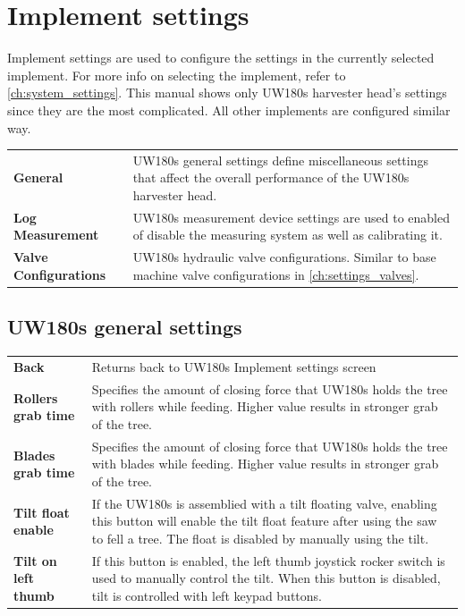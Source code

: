 \documentclass[12pt,a4paper,english]{uvmanual}
\begin{document}
\section{Implement settings}\label{ch:settings_implement}

Implement settings are used to configure the settings in the currently selected implement. For more info on selecting the implement, refer to \autoref{ch:system_settings}. This manual shows only UW180s harvester head's settings since they are the most complicated. All other implements are configured similar way.


\begin{tabular}{ L{0.2\textwidth} L{0.66\textwidth} }
\textbf{General} & UW180s general settings define miscellaneous settings that affect the overall performance of the UW180s harvester head. \\
\textbf{Log Measurement} & UW180s measurement device settings are used to enabled of disable the measuring system as well as calibrating it. \\
\textbf{Valve Configurations} & UW180s hydraulic valve configurations. Similar to base machine valve configurations in \autoref{ch:settings_valves}. \\
\end{tabular}

\FloatBarrier
\subsection{UW180s general settings}\label{ch:settings_uw180s_meas}


\begin{tabular}{ L{0.2\textwidth} L{0.66\textwidth} }
\textbf{Back} & Returns back to UW180s Implement settings screen \\
\textbf{Rollers grab time} & Specifies the amount of closing force that UW180s holds the tree with rollers while feeding. Higher value results in stronger grab of the tree. \\
\textbf{Blades grab time} & Specifies the amount of closing force that UW180s holds the tree with blades while feeding. Higher value results in stronger grab of the tree. \\
\textbf{Tilt float enable} & If the UW180s is assemblied with a tilt floating valve, enabling this button will enable the tilt float feature after using the saw to fell a tree. The float is disabled by manually using the tilt. \\
\textbf{Tilt on left thumb} & If this button is enabled, the left thumb joystick rocker switch is used to manually control the tilt. When this button is disabled, tilt is controlled with left keypad buttons. \\
\end{tabular}
\end{document}
